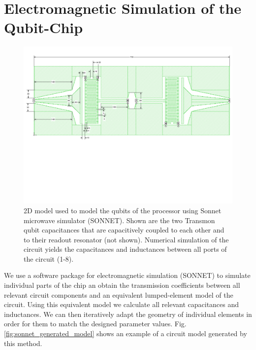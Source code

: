 \section{Electromagnetic Simulation of the Qubit-Chip}

\begin{figure}[ht!]
	\centering
	\includegraphics[width=\textwidth]{./material/figures/2-qubit-processor/sonnet_simulation_of_qubit_chip}
	\caption[]{2D model used to model the qubits of the processor using Sonnet microwave simulator (SONNET). Shown are the two Transmon qubit capacitances that are capacitively coupled to each other and to their readout resonator (not shown). Numerical simulation of the circuit yields the capacitances and inductances between all ports of the circuit (1-8).}
	\label{fig:sonnet_model_of_qubit_chip}
\end{figure}

We use a software package for electromagnetic simulation (SONNET) to simulate individual parts of the chip an obtain the transmission coefficients between all relevant circuit components and an equivalent lumped-element model of the circuit. Using this equivalent model we calculate all relevant capacitances and inductances. We can then iteratively adapt the geometry of individual elements in order for them to match the designed parameter values. Fig. \ref{fig:sonnet_generated_model} shows an example of a circuit model generated by this method.

\smallskip

